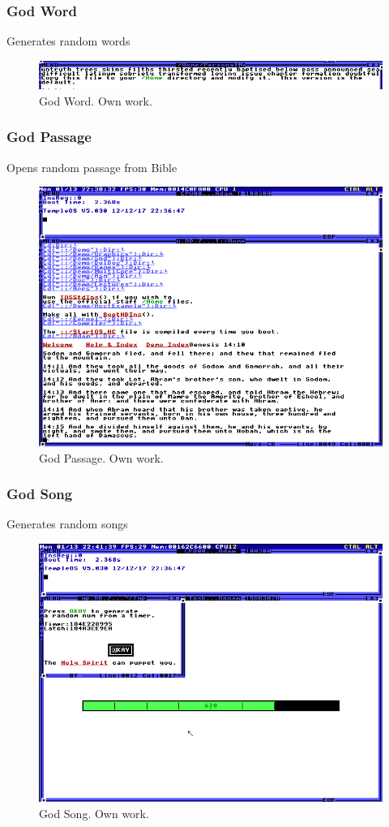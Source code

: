 \documentclass{beamer}
\begin{document}
	\begin{frame}
		\frametitle{God Word}
		Generates random words
		\begin{figure}
			\centering
			\includegraphics[width=0.95\linewidth]{images/god_word.png}
			\caption{God Word. Own work.}
			\label{fig:god_work}
		\end{figure}
	\end{frame}

	\begin{frame}
		\frametitle{God Passage}
		Opens random passage from Bible
		\begin{figure}
			\centering
			\includegraphics[width=0.6\linewidth]{images/god_passage.png}
			\caption{God Passage. Own work.}
			\label{fig:god_passage}
		\end{figure}
	\end{frame}

	\begin{frame}
		\frametitle{God Song}
		Generates random songs
		\begin{figure}
			\centering
			\includegraphics[width=0.6\linewidth]{images/god_song.png}
			\caption{God Song. Own work.}
			\label{fig:gods_song}
		\end{figure}
	\end{frame}
\end{document}
